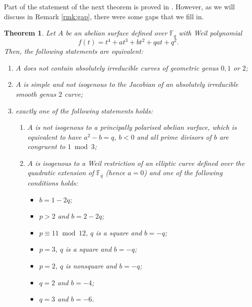 \documentclass[11pt]{amsart}
\newcommand\Fq{\mathbb{F}_q}
\theoremstyle{plain}
\newtheorem{theorem}{Theorem}[section]
\theoremstyle{definition}
\begin{document}
Part of the statement of the next theorem is proved in \cite{MYFE1}. However, as we will discuss in Remark \ref{rmk:gap}, there were some gaps that we fill in.
\begin{theorem}\label{thm:no_g1g2}
    Let $A$ be an abelian surface defined over $\Fq$ with
    Weil polynomial 
    \[ f(t) = t^4 +a t^3 +bt^2+qat+q^2. \]
    Then, the following statements are equivalent:
    \begin{enumerate}[label = (\roman*), ref=(\roman*)]
    \item\label{nocurves} $A$ does not contain absolutely irreducible curves of geometric genus $0, 1$ or $2$;
    \item\label{simple_nojac}   $A$ is simple and not isogenous to the Jacobian of an absolutely irreducible smooth genus $2$ curve;
    \item\label{nopp_wr} exactly one of the following statements holds:
        \begin{enumerate}[label = (\alph*), ref=\theenumi{}.(\alph*)]
            \item\label{not_isog_PP} $A$ is not isogenous to a principally polarised abelian surface, which is equivalent to have $a^2-b =q$, $b<0$ and all prime divisors of $b$ are congruent to $1 \bmod 3$;
            \item \label{weil_restr} $A$ is isogenous to a Weil restriction of an elliptic curve defined over the quadratic extension of $\Fq$ (hence $a=0$) and one of the following conditions holds:
            \begin{itemize}
                \item $b = 1-2q$;
                \item $p>2$ and $b=2-2q$;
                \item $p \equiv 11 \bmod 12$, $q$ is a square and $b=-q$;
                \item $p=3$, $q$ is a square and $b=-q$;
                \item $p=2$, $q$ is nonsquare and $b=-q$;
                \item $q=2$ and $b=-4$;
                \item $q=3$ and $b=-6$.
            \end{itemize}
        \end{enumerate}
    \end{enumerate}
\end{theorem}
\end{document}
